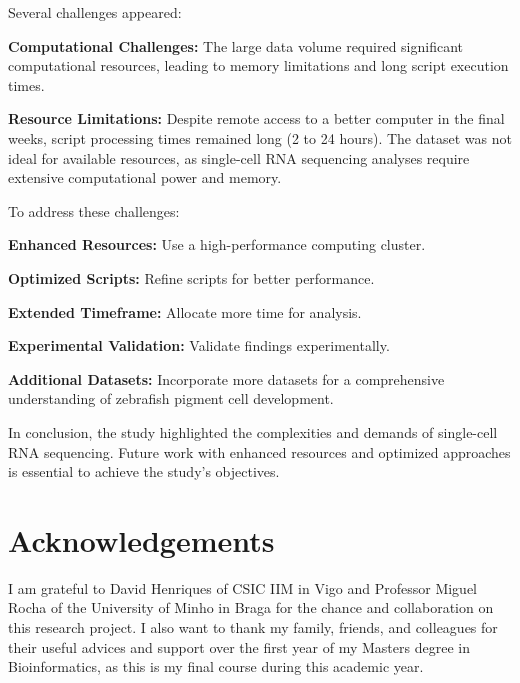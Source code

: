 \documentclass[runningheads]{llncs}
\begin{document}
Several challenges appeared:

\textbf{Computational Challenges:} The large data volume required significant computational resources, leading to memory limitations and long script execution times.

\textbf{Resource Limitations:} Despite remote access to a better computer in the final weeks, script processing times remained long (2 to 24 hours). The dataset was not ideal for available resources, as single-cell RNA sequencing analyses require extensive computational power and memory.

To address these challenges:

\textbf{Enhanced Resources:} Use a high-performance computing cluster.

\textbf{Optimized Scripts:} Refine scripts for better performance.

\textbf{Extended Timeframe:} Allocate more time for analysis.

\textbf{Experimental Validation:} Validate findings experimentally.

\textbf{Additional Datasets:} Incorporate more datasets for a comprehensive understanding of zebrafish pigment cell development.

In conclusion, the study highlighted the complexities and demands of single-cell RNA sequencing. Future work with enhanced resources and optimized approaches is essential to achieve the study's objectives.

\section*{Acknowledgements}
I am grateful to David Henriques of CSIC IIM in Vigo and Professor Miguel Rocha of the University of Minho in Braga for the chance and collaboration on this research project. I also want to thank my family, friends, and colleagues for their useful advices and support over the first year of my Masters degree in Bioinformatics, as this is my final course during this academic year.

\newpage


\end{document}
